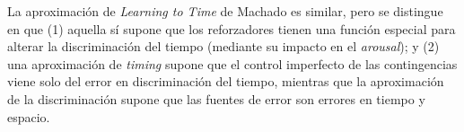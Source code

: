\documentclass[a4paper,12pt]{article}
\begin{document}
La aproximación de {\itshape Learning to Time} de Machado es similar, pero se distingue en que (1) aquella sí supone que los reforzadores tienen una función especial para alterar la discriminación del tiempo (mediante su impacto en el {\itshape arousal}); y (2) una aproximación de {\itshape timing} supone que el control imperfecto de las contingencias viene solo del error en discriminación del tiempo, mientras que la aproximación de la discriminación supone que las fuentes de error son errores en tiempo y espacio.
\end{document}
